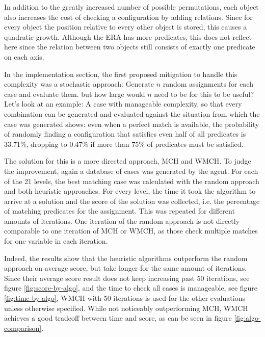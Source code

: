 In addition to the greatly increased number of possible permutations, each object also increases the cost of checking a configuration by adding relations.
Since for every object the position relative to every other object is stored, this causes a quadratic growth. Although the ERA has more predicates, this does not reflect here since the relation between two objects still consists of exactly one predicate on each axis.


In the implementation section, the first proposed mitigation to handle this complexity was a stochastic approach: Generate $n$ random assignments for each case and evaluate them. but how large would $n$ need to be for this to be useful?
Let's look at an example: A case with manageable complexity, so that every combination can be generated and evaluated against the situation from which the case was generated shows: even when a perfect match is available, the probability of randomly finding a configuration that satisfies even half of all predicates is 33.71\%, dropping to 0.47\% if more than 75\% of predicates must be satisfied.


The solution for this is a more directed approach, \ac{MCH} and \ac{WMCH}. To judge the improvement, again a database of cases was generated by the agent.
For each of the 21 levels, the best matching case was calculated with the random approach and both heuristic approaches. For every level, the time it took the algorithm to arrive at a solution and the score of the solution was collected, i.e. the percentage of matching predicates for the assignment. This was repeated for different amounts of iterations. One iteration of the random approach is not directly comparable to one iteration of \ac{MCH} or \ac{WMCH}, as those check multiple matches for one variable in each iteration.

Indeed, the results show that the heuristic algorithms outperform the random approach on average score, but take longer for the same amount of iterations. Since their average score result does not keep increasing past 50 iterations, see figure \ref{fig:score-by-algo}, and the time to check all cases is manageable, see figure \ref{fig:time-by-algo}, \ac{WMCH} with 50 iterations is used for the other evaluations unless otherwise specified.
While not noticeably outperforming \ac{MCH}, \ac{WMCH} achieves a good tradeoff between time and score, as can be seen in figure \ref{fig:algo-comparison}.

